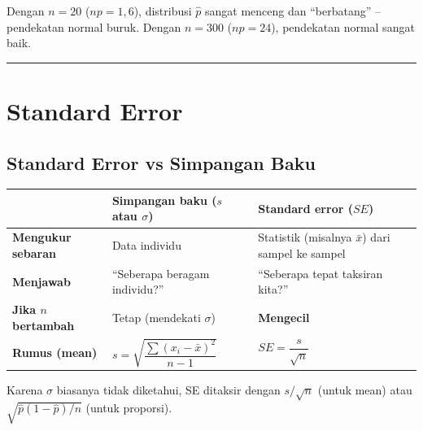 \documentclass[
  indonesian,
  letterpaper,
]{book}
\newcounter{none} %
\begin{document}
Dengan \(n = 20\) (\(np = 1{,}6\)), distribusi \(\hat{p}\) sangat
menceng dan ``berbatang'' -- pendekatan normal buruk. Dengan \(n = 300\)
(\(np = 24\)), pendekatan normal sangat baik.

\begin{center}\rule{0.5\linewidth}{0.5pt}\end{center}

\section{Standard Error}\label{standard-error}

\subsection{Standard Error vs Simpangan
Baku}\label{standard-error-vs-simpangan-baku}

{\def\LTcaptype{none} %
\begin{longtable}[]{@{}
  >{\raggedright\arraybackslash}p{}
  >{\raggedright\arraybackslash}p{}
  >{\raggedright\arraybackslash}p{}@{}}
\toprule\noalign{}
\begin{minipage}[b]{\linewidth}\raggedright
\end{minipage} & \begin{minipage}[b]{\linewidth}\raggedright
Simpangan baku (\(s\) atau \(\sigma\))
\end{minipage} & \begin{minipage}[b]{\linewidth}\raggedright
Standard error (\(SE\))
\end{minipage} \\
\midrule\noalign{}
\endhead
\bottomrule\noalign{}
\endlastfoot
\textbf{Mengukur sebaran} & Data individu & Statistik (misalnya
\(\bar{x}\)) dari sampel ke sampel \\
\textbf{Menjawab} & ``Seberapa beragam individu?'' & ``Seberapa tepat
taksiran kita?'' \\
\textbf{Jika \(n\) bertambah} & Tetap (mendekati \(\sigma\)) &
\textbf{Mengecil} \\
\textbf{Rumus (mean)} &
\(s = \sqrt{\dfrac{\sum (x_i - \bar{x})^2}{n-1}}\) &
\(SE = \dfrac{s}{\sqrt{n}}\) \\
\end{longtable}
}

Karena \(\sigma\) biasanya tidak diketahui, SE ditaksir dengan
\(s/\sqrt{n}\) (untuk mean) atau \(\sqrt{\hat{p}(1-\hat{p})/n}\) (untuk
proporsi).
\end{document}
